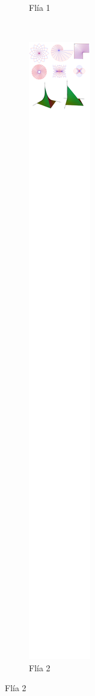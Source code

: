 \begin{figure}[t!]
\begin{subfigure}[t]{0.5\textwidth}
\caption{Flía 1}
\end{subfigure}%
~
\begin{subfigure}[t]{0.5\textwidth}
\centering
\includegraphics[scale=0.4,trim={358px 9876px 270px 24px},clip]{images/04_analisis2/am2.png}
\caption{Flía 2}
\end{subfigure}


\end{figure}
